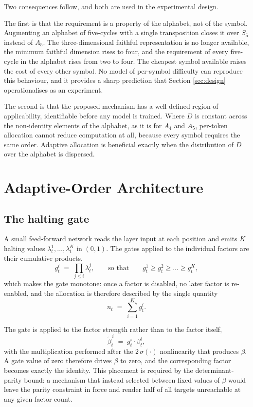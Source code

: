 Two consequences follow, and both are used in the experimental design.

The first is that the requirement is a property of the alphabet, not of the
symbol. Augmenting an alphabet of five-cycles with a single transposition closes
it over $S_5$ instead of $A_5$. The three-dimensional faithful representation is
no longer available, the minimum faithful dimension rises to four, and the
requirement of every five-cycle in the alphabet rises from two to four. The
cheapest symbol available raises the cost of every other symbol. No model of
per-symbol difficulty can reproduce this behaviour, and it provides a sharp
prediction that Section \ref{sec:design} operationalises as an experiment.

The second is that the proposed mechanism has a well-defined region of
applicability, identifiable before any model is trained. Where $D$ is constant
across the non-identity elements of the alphabet, as it is for $A_4$ and $A_5$,
per-token allocation cannot reduce computation at all, because every symbol
requires the same order. Adaptive allocation is beneficial exactly when the
distribution of $D$ over the alphabet is dispersed.

\section{Adaptive-Order Architecture}
\label{sec:mechanism}

\subsection{The halting gate}

A small feed-forward network reads the layer input at each position and emits
$K$ halting values $\lambda_t^{1}, \dots, \lambda_t^{K}$ in $(0,1)$. The gates
applied to the individual factors are their cumulative products,
\begin{equation}
g_t^{i} \;=\; \prod_{j \le i} \lambda_t^{j},
\qquad\text{so that}\qquad
g_t^{1} \ge g_t^{2} \ge \dots \ge g_t^{K},
\end{equation}
which makes the gate monotone: once a factor is disabled, no later factor is
re-enabled, and the allocation is therefore described by the single quantity
\begin{equation}
n_t \;=\; \sum_{i=1}^{K} g_t^{i}.
\end{equation}

The gate is applied to the factor strength rather than to the factor itself,
\begin{equation}
\tilde{\beta}_t^{\,i} \;=\; g_t^{i} \cdot \beta_t^{i},
\end{equation}
with the multiplication performed after the $2\,\sigma(\cdot)$ nonlinearity that
produces $\beta$. A gate value of zero therefore drives $\beta$ to zero, and the
corresponding factor becomes exactly the identity. This placement is required by
the determinant-parity bound: a mechanism that instead selected between fixed
values of $\beta$ would leave the parity constraint in force and render half of
all targets unreachable at any given factor count.

